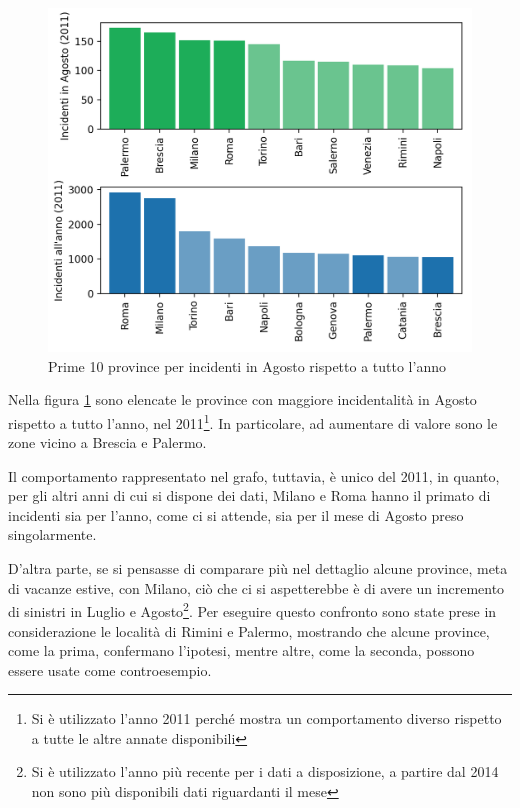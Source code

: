 \documentclass[a4paper,12pt]{report}
\begin{document}
\begin{figure}
    \includegraphics[width=\linewidth]{../src/incidenti/incidenti_senza_coords/mese_incidenti/mesi_estivi.png}
    \caption{Prime 10 province per incidenti in Agosto rispetto a tutto l'anno}
    \label{fig:mesi-estivi}
\end{figure}

Nella figura \ref{fig:mesi-estivi} sono elencate le province con maggiore incidentalità 
in Agosto rispetto a tutto l'anno, nel 
2011\footnote{Si è utilizzato l'anno 2011 perché mostra un comportamento diverso rispetto a 
tutte le altre annate disponibili}. 
In particolare, ad aumentare di valore sono le zone vicino a Brescia e Palermo. 

Il comportamento rappresentato nel grafo, tuttavia, è unico del 2011, in quanto, 
per gli altri anni di cui si dispone dei dati, 
Milano e Roma hanno il primato di incidenti sia per l'anno, come ci si attende, sia per il 
mese di Agosto preso singolarmente. 

D'altra parte, se si pensasse di comparare più nel dettaglio alcune province, 
meta di vacanze estive, con Milano, ciò che ci si aspetterebbe è 
di avere un incremento di sinistri in Luglio e 
Agosto\footnote{Si è utilizzato l'anno più recente per i dati a disposizione, 
a partire dal 2014 non sono più disponibili dati riguardanti il mese}. 
Per eseguire questo confronto sono state prese in considerazione le 
località di Rimini e Palermo, mostrando che alcune province, come la prima, 
confermano l'ipotesi, mentre altre, 
come la seconda, possono essere usate come controesempio. 
\end{document}
